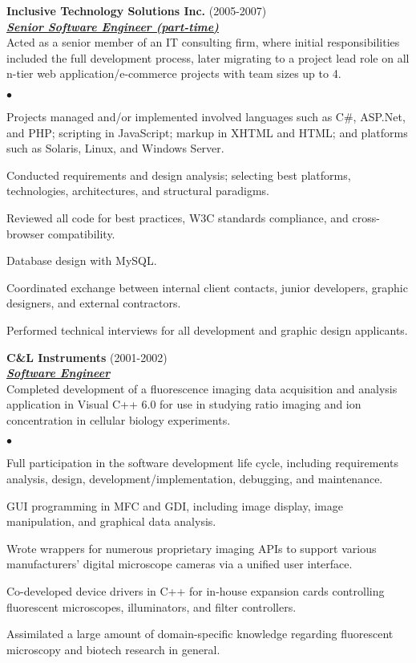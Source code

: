 \documentclass{article}
\newcommand{\employer}[3]{{ \textbf{#1} (#2)\\ \underline{\textbf{\emph{#3}}}\\  }}
\newenvironment{achievements}{\begin{list}{$\bullet$}{\topsep 0pt \itemsep
      -2pt}}{\vspace*{4pt}\end{list}}
\begin{document}
\employer{Inclusive Technology Solutions Inc.}{2005-2007}{Senior Software
  Engineer (part-time)} Acted as a senior member of an IT consulting firm,
where initial responsibilities included the full development process, later
migrating to a project lead role on all n-tier web application/e-commerce
projects with team sizes up to 4.
\begin{achievements}
\item Projects managed and/or implemented involved languages such as C\#,
  ASP.Net, and PHP; scripting in JavaScript; markup in XHTML and HTML; and
  platforms such as Solaris, Linux, and Windows Server.
\item Conducted requirements and design analysis; selecting best platforms,
  technologies, architectures, and structural paradigms.
\item Reviewed all code for best practices, W3C standards compliance, and
  cross-browser compatibility.
\item Database design with MySQL.
\item Coordinated exchange between internal client contacts, junior developers,
  graphic designers, and external contractors.
\item Performed technical interviews for all development and graphic design
  applicants.
\end{achievements}

\employer{C\&L Instruments}{2001-2002}{Software Engineer} Completed development
of a fluorescence imaging data acquisition and analysis application in Visual
C++ 6.0 for use in studying ratio imaging and ion concentration in cellular
biology experiments.
\begin{achievements}
\item Full participation in the software development life cycle, including
  requirements analysis, design, development/implementation, debugging, and
  maintenance.
\item GUI programming in MFC and GDI, including image display, image
  manipulation, and graphical data analysis.
\item Wrote wrappers for numerous proprietary imaging APIs to support various
  manufacturers' digital microscope cameras via a unified user interface.
\item Co-developed device drivers in C++ for in-house expansion cards
  controlling fluorescent microscopes, illuminators, and filter controllers.
\item Assimilated a large amount of domain-specific knowledge regarding
  fluorescent microscopy and biotech research in general.
\end{achievements}
\end{document}
